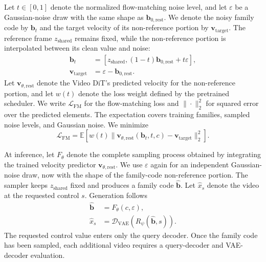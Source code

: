 Let $t\in[0,1]$ denote the normalized flow-matching noise level, and let
$\varepsilon$ be a Gaussian-noise draw with the same shape as
$\mathbf b_{0,\mathrm{rest}}$. We denote the noisy family code by
$\mathbf b_t$ and the target velocity of its non-reference portion by
$\mathbf v_{\mathrm{target}}$. The reference frame $z_{\mathrm{shared}}$
remains fixed, while the non-reference portion is interpolated between
its clean value and noise:
\begin{equation}
\begin{aligned}
    \mathbf b_t&=[z_{\mathrm{shared}},
       (1-t)\mathbf b_{0,\mathrm{rest}}+t\varepsilon],\\
    \mathbf v_{\mathrm{target}}&=\varepsilon-\mathbf b_{0,\mathrm{rest}}.
\end{aligned}
\label{eq:lfvd_forward}
\end{equation}
Let $\mathbf v_{\theta,\mathrm{rest}}$ denote the Video DiT's predicted
velocity for the non-reference portion, and let $w(t)$ denote the loss
weight defined by the pretrained scheduler. We write
$\mathcal L_{\mathrm{FM}}$ for the flow-matching loss and
$\|\cdot\|_2^2$ for squared error over the predicted elements. The
expectation covers training families, sampled noise levels, and Gaussian
noise. We minimize
\begin{equation}
    \mathcal L_{\mathrm{FM}}=
    \mathbb E\left[w(t)
    \|\mathbf v_{\theta,\mathrm{rest}}(\mathbf b_t,t,c)
      -\mathbf v_{\mathrm{target}}\|_2^2\right].
    \label{eq:lfvd_objective}
\end{equation}

At inference, let $F_\theta$ denote the complete sampling process
obtained by integrating the trained velocity predictor
$\mathbf v_{\theta,\mathrm{rest}}$. We use $\varepsilon$ again for an
independent Gaussian-noise draw, now with the shape of the family-code
non-reference portion. The sampler keeps $z_{\mathrm{shared}}$ fixed and
produces a family code $\hat{\mathbf b}$. Let $\hat x_s$ denote the video
at the requested control $s$. Generation follows
\begin{equation}
\begin{aligned}
    \hat{\mathbf b}&=F_\theta(c,\varepsilon),\\
    \hat x_s&=\mathcal D_{\mathrm{VAE}}
       \!\left(R_\psi(\hat{\mathbf b},s)\right).
\end{aligned}
\label{eq:lfvd_generation}
\end{equation}
The requested control value enters only the query decoder. Once the family
code has been sampled, each additional video requires a query-decoder
and VAE-decoder evaluation. 



